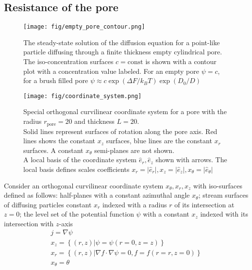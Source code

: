 \documentclass[10pt, a4paper]{article}
\begin{document}
\subsection*{Resistance of the pore}

\begin{multicols}{2}

\begin{figure}[H]
    \centering
    \texttt{[image: fig/empty\_pore\_contour.png]}
    \caption{
        The steady-state solution of the diffusion equation for a point-like particle diffusing through a finite thickness empty cylindrical pore.
        The iso-concentration surfaces $c = \textrm{const}$ is shown with a contour plot with a concentration value labeled.
        For an empty pore $\psi = c$, for a brush filled pore $\psi \approx c\exp(\Delta F / k_B T)\exp(D_0/D)$
        }
    \label{fig:empty_pore_solution}
\end{figure}
\begin{figure}[H]
    \centering
    \texttt{[image: fig/coordinate\_system.png]}
    \caption{
        Special orthogonal curvilinear coordinate system for a pore with the radius $r_{\textrm{pore}} = 20$ and thickness $L=20$.
        \\
        Solid lines represent surfaces of rotation along the pore axis.
        Red lines shows the constant $x_{z}$ surfaces, blue lines are the constant $x_{r}$ surfaces.
        A constant $x_{\theta}$ semi-planes are not shown.
        \\
        A local basis of the coordinate system $\hat{e}_r, \hat{e}_z$ shown with arrows.
        The local basis defines scales coefficients $x_r = |\hat{e}_r|, x_z = |\hat{e}_z|, x_{\theta} = |\hat{e}_{\theta}|$
        }
    \label{fig:coordinate_system}
\end{figure}

Consider an orthogonal curvilinear coordinate system $x_{\theta}, x_{r}, x_{z}$ with iso-surfaces defined as follows:
half-planes with a constant azimuthal angle $x_{\theta}$;
stream surfaces of diffusing particles constant $x_{r}$ indexed with a radius $r$ of its intersection at $z=0$;
the level set of the potential function $\psi$ with a constant $x_{z}$ indexed with its intersection with $z$-axis
\begin{gather}
    j = \nabla \psi
    \\
    x_z = \left\{(r, z) | \psi = \psi(r=0, z=z)\right\}
    \\
    x_r = \left\{(r, z) | \nabla f \cdot \nabla \psi = 0, f = f(r=r, z=0) \right\}
    \\
    x_{\theta} = \theta
\end{gather}


\end{multicols}
\end{document}
